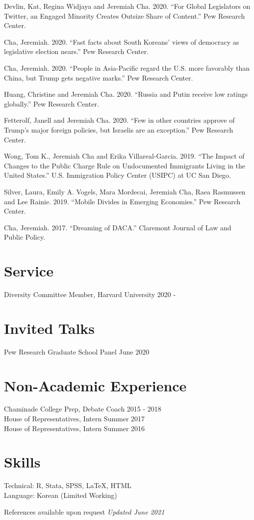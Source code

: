 \documentclass[margin, line]{res}
\begin{document}
\begin{resume}
\begin{etaremune}
	\item Devlin, Kat, Regina Widjaya and Jeremiah Cha. 2020. ``For Global Legislators on Twitter, an Engaged Minority Creates Outsize Share of Content.'' Pew Research Center.
	\item Cha, Jeremiah. 2020. ``Fast facts about South Koreans’ views of democracy as legislative election nears.'' Pew Research Center.
	\item Cha, Jeremiah. 2020. ``People in Asia-Pacific regard the U.S. more favorably than China, but Trump gets negative marks.'' Pew Research Center.
	\item Huang, Christine and Jeremiah Cha. 2020. ``Russia and Putin receive low ratings globally.'' Pew Research Center.
	\item Fetterolf, Janell and Jeremiah Cha. 2020. ``Few in other countries approve of Trump’s major foreign policies, but Israelis are an exception.'' Pew Research Center.
	\item Wong, Tom K., Jeremiah Cha and Erika Villareal-Garcia. 2019. ``The Impact of Changes to the Public Charge Rule on Undocumented Immigrants Living in the United States.'' U.S. Immigration Policy Center (USIPC) at UC San Diego.
	\item Silver, Laura, Emily A. Vogels, Mara Mordecai, Jeremiah Cha, Raea Rasmussen and Lee Rainie. 2019. ``Mobile Divides in Emerging Economies.'' Pew Research Center.
	\item Cha, Jeremiah. 2017. ``Dreaming of DACA.'' Claremont Journal of Law and Public Policy.
\end{etaremune}


\section{Service}
Diversity Committee Member, Harvard University \hfill 2020 -

\section{Invited Talks}
Pew Research Graduate School Panel \hfill June 2020

\section{Non-Academic Experience}
Chaminade College Prep, Debate Coach \hfill 2015 - 2018\\
House of Representatives, Intern \hfill Summer 2017\\
House of Representatives, Intern \hfill Summer 2016

\section{Skills}
Technical: R, Stata, SPSS, \LaTeX, HTML\\
Language: Korean (Limited Working)

\small{References available upon request} \hfill \small{\textit{Updated June 2021}}

\end{resume}
\end{document}
